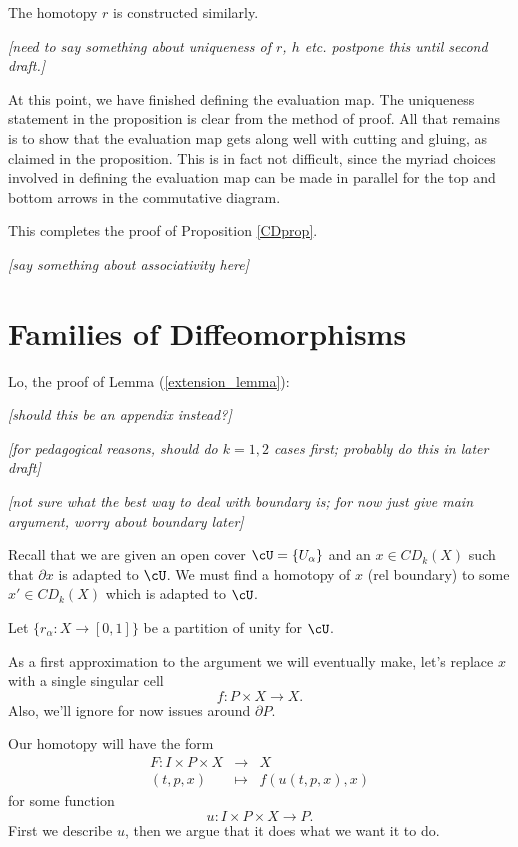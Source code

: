 \documentclass[11pt,leqno]{amsart}
\def\bd{\partial}
\def\nn#1{{{\it \small [#1]}}}
\newcommand{\eq}[1]{\begin{displaymath}#1\end{displaymath}}
\newcommand{\eqar}[1]{\begin{eqnarray*}#1\end{eqnarray*}}
\begin{document}
The homotopy $r$ is constructed similarly.

\nn{need to say something about uniqueness of $r$, $h$ etc.
postpone this until second draft.}

At this point, we have finished defining the evaluation map.
The uniqueness statement in the proposition is clear from the method of proof.
All that remains is to show that the evaluation map gets along well with cutting and gluing,
as claimed in the proposition.
This is in fact not difficult, since the myriad choices involved in defining the
evaluation map can be made in parallel for the top and bottom
arrows in the commutative diagram.

This completes the proof of Proposition \ref{CDprop}.

\medskip

\nn{say something about associativity here}




\section{Families of Diffeomorphisms}  \label{fam_diff_sect}


Lo, the proof of Lemma (\ref{extension_lemma}):

\nn{should this be an appendix instead?}

\nn{for pedagogical reasons, should do $k=1,2$ cases first; probably do this in
later draft}

\nn{not sure what the best way to deal with boundary is; for now just give main argument, worry
about boundary later}

Recall that we are given
an open cover $\cU = \{U_\alpha\}$ and an
$x \in CD_k(X)$ such that $\bd x$ is adapted to $\cU$.
We must find a homotopy of $x$ (rel boundary) to some $x' \in CD_k(X)$ which is adapted to $\cU$.

Let $\{r_\alpha : X \to [0,1]\}$ be a partition of unity for $\cU$.

As a first approximation to the argument we will eventually make, let's replace $x$
with a single singular cell
\eq{
    f: P \times X \to X .
}
Also, we'll ignore for now issues around $\bd P$.

Our homotopy will have the form
\eqar{
    F: I \times P \times X &\to& X \\
    (t, p, x) &\mapsto& f(u(t, p, x), x)
}
for some function
\eq{
    u : I \times P \times X \to P .
}
First we describe $u$, then we argue that it does what we want it to do.
\end{document}
